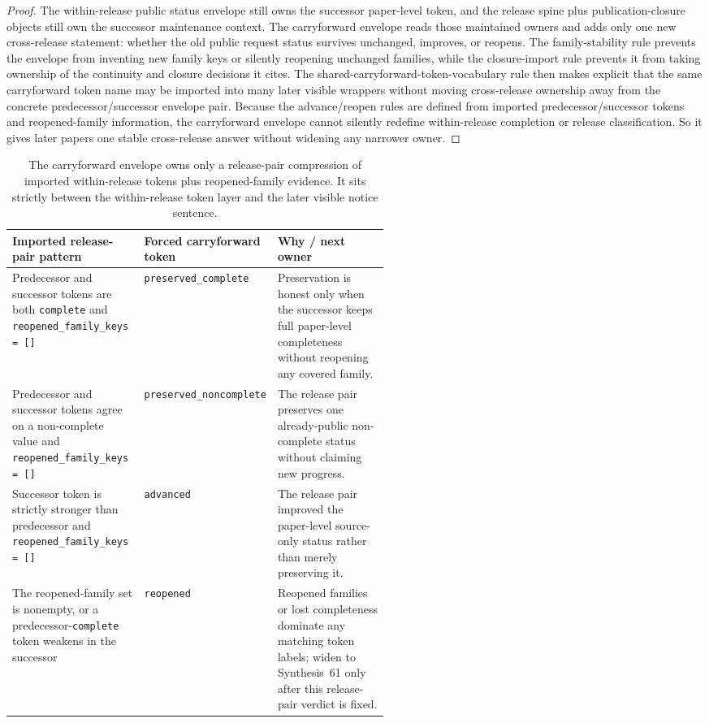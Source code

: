 \documentclass[11pt]{article}
\begin{document}
\begin{proof}
The within-release public status envelope still owns the successor paper-level token, and the release spine plus publication-closure objects still own the successor maintenance context.
The carryforward envelope reads those maintained owners and adds only one new cross-release statement: whether the old public request status survives unchanged, improves, or reopens.
The family-stability rule prevents the envelope from inventing new family keys or silently reopening unchanged families, while the closure-import rule prevents it from taking ownership of the continuity and closure decisions it cites.
The shared-carryforward-token-vocabulary rule then makes explicit that the same carryforward token name may be imported into many later visible wrappers without moving cross-release ownership away from the concrete predecessor/successor envelope pair.
Because the advance/reopen rules are defined from imported predecessor/successor tokens and reopened-family information, the carryforward envelope cannot silently redefine within-release completion or release classification.
So it gives later papers one stable cross-release answer without widening any narrower owner.\qedhere
\end{proof}

\begin{table}[t]
\centering
\small
\begin{tabularx}{0.97\linewidth}{@{}p{0.35\linewidth}p{0.19\linewidth}X@{}}
\toprule
\textbf{Imported release-pair pattern} & \textbf{Forced carryforward token} & \textbf{Why / next owner}\\
\midrule
Predecessor and successor tokens are both \texttt{complete} and \texttt{reopened\_family\_keys = []} & \texttt{preserved\_complete} & Preservation is honest only when the successor keeps full paper-level completeness without reopening any covered family.\\
Predecessor and successor tokens agree on a non-complete value and \texttt{reopened\_family\_keys = []} & \texttt{preserved\_noncomplete} & The release pair preserves one already-public non-complete status without claiming new progress.\\
Successor token is strictly stronger than predecessor and \texttt{reopened\_family\_keys = []} & \texttt{advanced} & The release pair improved the paper-level source-only status rather than merely preserving it.\\
The reopened-family set is nonempty, or a predecessor-\texttt{complete} token weakens in the successor & \texttt{reopened} & Reopened families or lost completeness dominate any matching token labels; widen to Synthesis~61 only after this release-pair verdict is fixed.\\
\bottomrule
\end{tabularx}
\caption{The carryforward envelope owns only a release-pair compression of imported within-release tokens plus reopened-family evidence. It sits strictly between the within-release token layer and the later visible notice sentence.}
\label{tab:public-request-carryforward-token-matrix}
\end{table}
\end{document}
